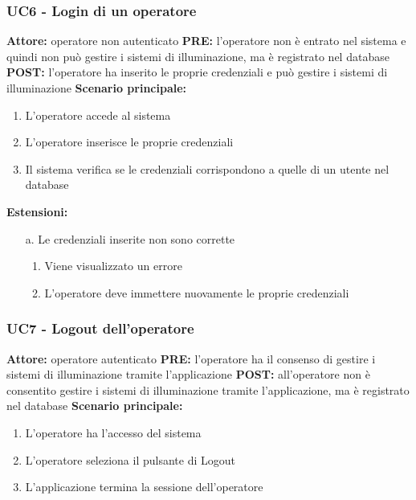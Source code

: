 \documentclass[a4paper, 12pt]{article}
\begin{document}
\subsubsection{UC6 - Login di un operatore}
\textbf{Attore:} operatore non autenticato\newline
\textbf{PRE:} l'operatore non è entrato nel sistema e quindi non può gestire i sistemi di illuminazione, ma è registrato nel database\newline
\textbf{POST:} l'operatore ha inserito le proprie credenziali e può gestire i sistemi di illuminazione\newline
\textbf{Scenario principale:}
\begin{enumerate}
    \item L'operatore accede al sistema
    \item L'operatore inserisce le proprie credenziali
    \item Il sistema verifica se le credenziali corrispondono a quelle di un utente nel database
\end{enumerate}
\textbf{Estensioni:}
\begin{itemize}
    \item [a.] Le credenziali inserite non sono corrette
    \begin{enumerate}
        \item Viene visualizzato un errore
        \item L'operatore deve immettere nuovamente le proprie credenziali
    \end{enumerate}
\end{itemize}

\subsubsection{UC7 - Logout dell'operatore}
\textbf{Attore:} operatore autenticato\newline
\textbf{PRE:} l'operatore ha il consenso di gestire i sistemi di illuminazione tramite l'applicazione\newline
\textbf{POST:} all'operatore non è consentito gestire i sistemi di illuminazione tramite l'applicazione, ma è registrato nel database\newline
\textbf{Scenario principale:}
\begin{enumerate}
    \item L'operatore ha l'accesso del sistema
    \item L'operatore seleziona il pulsante di Logout
    \item L'applicazione termina la sessione dell'operatore
\end{enumerate}
\end{document}

